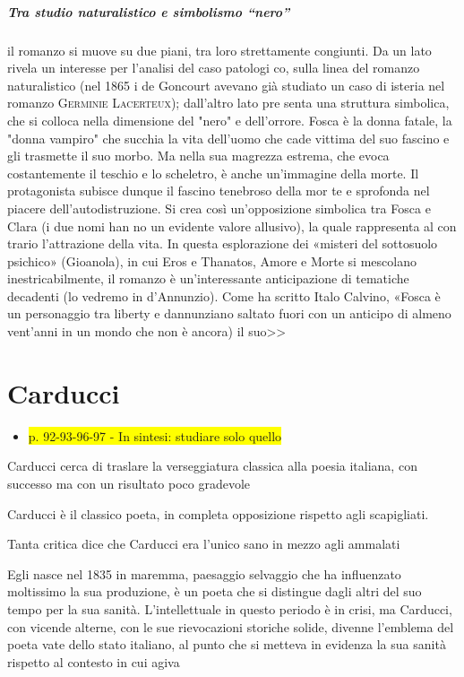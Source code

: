\documentclass{book}
\newcommand{\pagine}[1]{\colorbox{yellow}{#1}}
\newcounter{mar}
\begin{document}
\paragraph{Tra studio naturalistico e simbolismo ``nero''} il romanzo si muove su due piani, tra loro strettamente congiunti. Da un lato rivela un interesse per l'analisi del caso patologi co, sulla linea del romanzo naturalistico (nel 1865 i de Goncourt avevano già studiato un caso di isteria nel romanzo \textsc{Germinie Lacerteux}); dall'altro lato pre senta una struttura simbolica, che si colloca nella dimensione del "nero" e dell'orrore. Fosca è la donna fatale, la "donna vampiro" che succhia la vita dell'uomo che cade vittima del suo fascino e gli trasmette il suo morbo. Ma nella sua magrezza estrema, che evoca costantemente il teschio e lo scheletro, è anche un'immagine della morte.
Il protagonista subisce dunque il fascino tenebroso della mor te e sprofonda nel piacere dell'autodistruzione. Si crea così un'opposizione simbolica tra Fosca e Clara (i due nomi han no un evidente valore allusivo), la quale rappresenta al con trario l'attrazione della vita. In questa esplorazione dei «misteri del sottosuolo psichico» (Gioanola), in cui Eros e Thanatos, Amore e Morte si mescolano inestricabilmente, il romanzo è un'interessante anticipazione di tematiche decadenti (lo vedremo in d'Annunzio). Come ha scritto Italo Calvino, «Fosca è un personaggio tra liberty e dannunziano saltato fuori con un anticipo di almeno vent'anni in un mondo che non è ancora) il suo>>

\chapter{Carducci}

\begin{itemize}
\item
  \pagine{p. 92-93-96-97 - In sintesi: studiare solo quello}
\end{itemize}

Carducci cerca di traslare la verseggiatura classica alla poesia
italiana, con successo ma con un risultato poco gradevole

Carducci è il classico poeta, in completa opposizione rispetto agli
scapigliati.

Tanta critica dice che Carducci era l'unico sano in mezzo agli ammalati

Egli nasce nel 1835 in maremma, paesaggio selvaggio che ha influenzato
moltissimo la sua produzione, è un poeta che si distingue dagli altri
del suo tempo per la sua sanità. L'intellettuale in questo periodo è in
crisi, ma Carducci, con vicende alterne, con le sue rievocazioni
storiche solide, divenne l'emblema del poeta vate dello stato italiano,
al punto che si metteva in evidenza la sua sanità rispetto al contesto
in cui agiva
\end{document}
